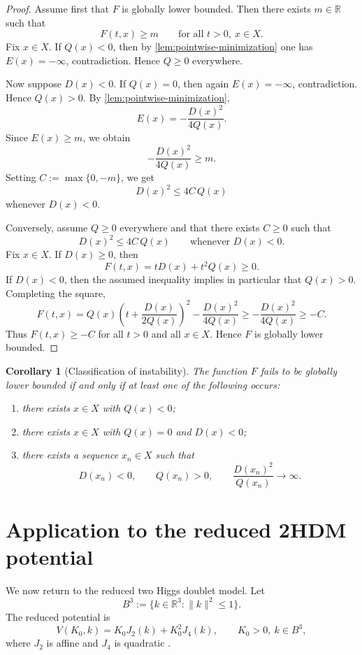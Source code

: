 \documentclass[11pt,a4paper]{article}
\newtheorem{corollary}[theorem]{Corollary}
\theoremstyle{definition}
\theoremstyle{remark}
\begin{document}
\begin{proof}
Assume first that $F$ is globally lower bounded. Then there exists $m\in\mathbb{R}$ such that
\[
F(t,x)\ge m
\qquad\text{for all }t>0,\ x\in X.
\]
Fix $x\in X$. If $Q(x)<0$, then by \cref{lem:pointwise-minimization} one has $E(x)=-\infty$, contradiction. Hence $Q\ge0$ everywhere.

Now suppose $D(x)<0$. If $Q(x)=0$, then again $E(x)=-\infty$, contradiction. Hence $Q(x)>0$. By \cref{lem:pointwise-minimization},
\[
E(x)=-\frac{D(x)^2}{4Q(x)}.
\]
Since $E(x)\ge m$, we obtain
\[
-\frac{D(x)^2}{4Q(x)}\ge m.
\]
Setting $C:=\max\{0,-m\}$, we get
\[
D(x)^2\le 4C\,Q(x)
\]
whenever $D(x)<0$.

Conversely, assume $Q\ge0$ everywhere and that there exists $C\ge0$ such that
\[
D(x)^2\le 4C\,Q(x)
\qquad\text{whenever }D(x)<0.
\]
Fix $x\in X$. If $D(x)\ge0$, then
\[
F(t,x)=tD(x)+t^2Q(x)\ge0.
\]
If $D(x)<0$, then the assumed inequality implies in particular that $Q(x)>0$. Completing the square,
\[
F(t,x)
=
Q(x)\left(t+\frac{D(x)}{2Q(x)}\right)^2-\frac{D(x)^2}{4Q(x)}
\ge -\frac{D(x)^2}{4Q(x)}
\ge -C.
\]
Thus $F(t,x)\ge -C$ for all $t>0$ and all $x\in X$. Hence $F$ is globally lower bounded.
\end{proof}

\begin{corollary}[Classification of instability]\label{cor:instability-classification}
The function $F$ fails to be globally lower bounded if and only if at least one of the following occurs:
\begin{enumerate}[label=(\arabic*)]
  \item there exists $x\in X$ with $Q(x)<0$;
  \item there exists $x\in X$ with $Q(x)=0$ and $D(x)<0$;
  \item there exists a sequence $x_n\in X$ such that
  \[
  D(x_n)<0,\qquad Q(x_n)>0,\qquad \frac{D(x_n)^2}{Q(x_n)}\to\infty.
  \]
\end{enumerate}
\end{corollary}

\section{Application to the reduced 2HDM potential}

We now return to the reduced two Higgs doublet model. Let
\[
B^3:=\{k\in\mathbb{R}^3:\|k\|^2\le1\}.
\]
The reduced potential is
\begin{equation}\label{eq:2hdm-reduced}
V(K_0,k)=K_0J_2(k)+K_0^2J_4(k),
\qquad K_0>0,\ k\in B^3,
\end{equation}
where $J_2$ is affine and $J_4$ is quadratic \citep{Maniatis2006,ToobySmith2026}.
\end{document}
